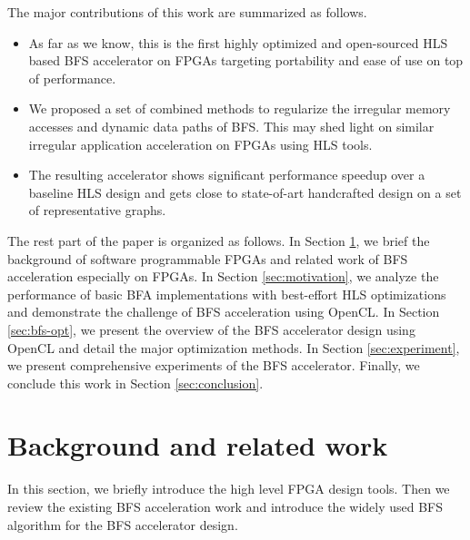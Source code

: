 The major contributions of this work are summarized as follows.
\begin{itemize}
    \item As far as we know, this is the first highly optimized and open-sourced 
		HLS based BFS accelerator on FPGAs targeting portability and ease of 
		use on top of performance. 
    \item We proposed a set of combined methods to regularize the irregular
		memory accesses and dynamic data paths of BFS. This may shed light on similar 
		irregular application acceleration on FPGAs using HLS tools.
    \item The resulting accelerator shows significant performance speedup 
        over a baseline HLS design and gets close to state-of-art handcrafted 
		design on a set of representative graphs.
\end{itemize}

The rest part of the paper is organized as follows. In Section \ref{sec:relatedwork}, 
we brief the background of software programmable FPGAs and related work of 
BFS acceleration especially on FPGAs. In Section \ref{sec:motivation},  
we analyze the performance of basic BFA implementations with best-effort HLS 
optimizations and demonstrate the challenge of BFS acceleration using OpenCL. 
In Section \ref{sec:bfs-opt}, we present the overview of the BFS accelerator 
design using OpenCL and detail the major optimization methods.
In Section \ref{sec:experiment}, we present comprehensive experiments of the 
BFS accelerator. Finally, we conclude this work in Section \ref{sec:conclusion}.

\section{Background and related work} \label{sec:relatedwork}
In this section, we briefly introduce the high level FPGA design tools.
Then we review the existing BFS acceleration work and introduce the widely 
used BFS algorithm for the BFS accelerator design.

